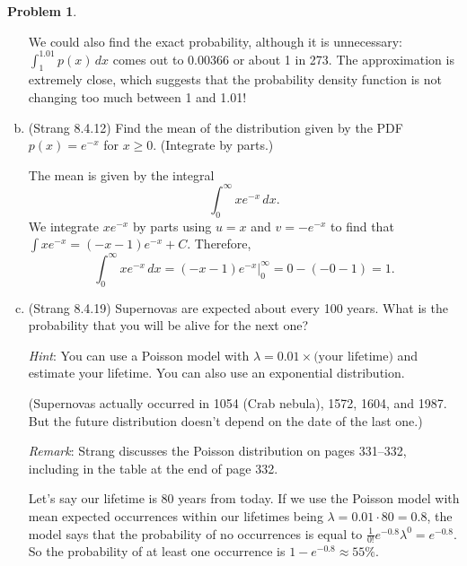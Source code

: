 \documentclass[11pt,oneside]{amsart}
\theoremstyle{definition}
\newtheorem{problem}{Problem}
\begin{document}
\begin{problem}
\begin{enumerate}[(a)]
\begin{solution}
                We could also find the exact probability, although it is unnecessary: $\int_1^{1.01}p(x)\,dx$ comes out to $0.00366$ or about 1 in 273. The approximation is extremely close, which suggests that the probability density function is not changing too much between 1 and 1.01!
            \end{solution}
            \item (Strang 8.4.12) Find the mean of the distribution given by the PDF $p(x)=e^{-x}$ for $x\geq 0$. (Integrate by parts.)
            \begin{solution}
                The mean is given by the integral
                \[\int_0^\infty xe^{-x}\,dx.\]
                We integrate $xe^{-x}$ by parts using $u=x$ and $v=-e^{-x}$ to find that $\int xe^{-x}=(-x-1)e^{-x}+C$. Therefore,
                \[\int_0^\infty xe^{-x}\,dx = (-x-1)e^{-x}\Big|_0^\infty=0-(-0-1)=1.\]
            \end{solution}
            \item (Strang 8.4.19) Supernovas are expected about every 100 years. What is the probability that you will be alive for the next one?
            
            \emph{Hint}: You can use a Poisson model with $\lambda=0.01\times\text{(your lifetime)}$ and estimate your lifetime. You can also use an exponential distribution.
            
            (Supernovas actually occurred in 1054 (Crab nebula), 1572, 1604, and 1987. But the future distribution doesn't depend on the date of the last one.)
            
            \emph{Remark}: Strang discusses the Poisson distribution on pages 331--332, including in the table at the end of page 332.
            \begin{solution}
                Let's say our lifetime is 80 years from today. If we use the Poisson model with mean expected occurrences within our lifetimes being $\lambda=0.01\cdot 80=0.8$, the model says that the probability of no occurrences is equal to $\frac 1{0!}e^{-0.8}\lambda^0=e^{-0.8}$. So the probability of at least one occurrence is $1-e^{-0.8}\approx 55\%$.


\end{solution}
\end{enumerate}
\end{problem}
\end{document}
